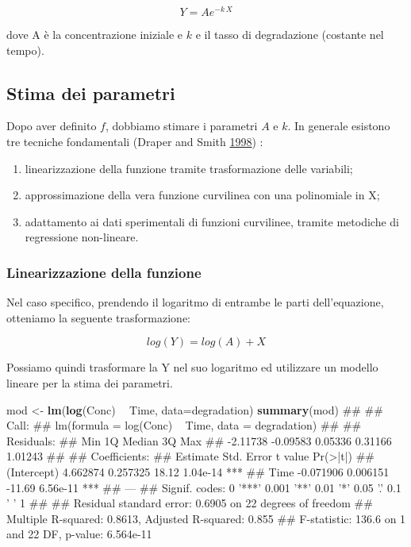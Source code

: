 \documentclass[a4paper,12pt,oneside]{book}
\providecommand{\tightlist}{%
  \setlength{\itemsep}{0pt}\setlength{\parskip}{0pt}}
\newenvironment{Shaded}{\begin{snugshade}}{\end{snugshade}}
\newcommand{\KeywordTok}[1]{\textcolor[rgb]{0.13,0.29,0.53}{\textbf{#1}}}
\newcommand{\DataTypeTok}[1]{\textcolor[rgb]{0.13,0.29,0.53}{#1}}
\newcommand{\StringTok}[1]{\textcolor[rgb]{0.31,0.60,0.02}{#1}}
\newcommand{\OperatorTok}[1]{\textcolor[rgb]{0.81,0.36,0.00}{\textbf{#1}}}
\newcommand{\NormalTok}[1]{#1}
\theoremstyle{definition}
\theoremstyle{definition}
\theoremstyle{definition}
\theoremstyle{remark}
\begin{document}
\[ Y = A e^{-k \,X} \]

dove A è la concentrazione iniziale e \(k\) e il tasso di degradazione
(costante nel tempo).

\subsection{Stima dei parametri}\label{stima-dei-parametri-3}

Dopo aver definito \(f\), dobbiamo stimare i parametri \(A\) e \(k\). In
generale esistono tre tecniche fondamentali (Draper and Smith
\protect\hyperlink{ref-draper1998_Appliedregressionanalysis}{1998}) :

\begin{enumerate}
\def\labelenumi{\arabic{enumi}.}
\tightlist
\item
  linearizzazione della funzione tramite trasformazione delle variabili;
\item
  approssimazione della vera funzione curvilinea con una polinomiale in
  X;
\item
  adattamento ai dati sperimentali di funzioni curvilinee, tramite
  metodiche di regressione non-lineare.
\end{enumerate}

\subsubsection{Linearizzazione della
funzione}\label{linearizzazione-della-funzione}

Nel caso specifico, prendendo il logaritmo di entrambe le parti
dell'equazione, otteniamo la seguente trasformazione:

\[ log(Y) = log(A) + X \]

Possiamo quindi trasformare la Y nel suo logaritmo ed utilizzare un
modello lineare per la stima dei parametri.

\begin{Shaded}
\begin{Highlighting}[]
\NormalTok{mod <-}\StringTok{ }\KeywordTok{lm}\NormalTok{(}\KeywordTok{log}\NormalTok{(Conc) }\OperatorTok{~}\StringTok{ }\NormalTok{Time, }\DataTypeTok{data=}\NormalTok{degradation)}
\KeywordTok{summary}\NormalTok{(mod)}
\NormalTok{## }
\NormalTok{## Call:}
\NormalTok{## lm(formula = log(Conc) ~ Time, data = degradation)}
\NormalTok{## }
\NormalTok{## Residuals:}
\NormalTok{##      Min       1Q   Median       3Q      Max }
\NormalTok{## -2.11738 -0.09583  0.05336  0.31166  1.01243 }
\NormalTok{## }
\NormalTok{## Coefficients:}
\NormalTok{##              Estimate Std. Error t value Pr(>|t|)    }
\NormalTok{## (Intercept)  4.662874   0.257325   18.12 1.04e-14 ***}
\NormalTok{## Time        -0.071906   0.006151  -11.69 6.56e-11 ***}
\NormalTok{## ---}
\NormalTok{## Signif. codes:  0 '***' 0.001 '**' 0.01 '*' 0.05 '.' 0.1 ' ' 1}
\NormalTok{## }
\NormalTok{## Residual standard error: 0.6905 on 22 degrees of freedom}
\NormalTok{## Multiple R-squared:  0.8613, Adjusted R-squared:  0.855 }
\NormalTok{## F-statistic: 136.6 on 1 and 22 DF,  p-value: 6.564e-11}
\end{Highlighting}
\end{Shaded}
\end{document}

